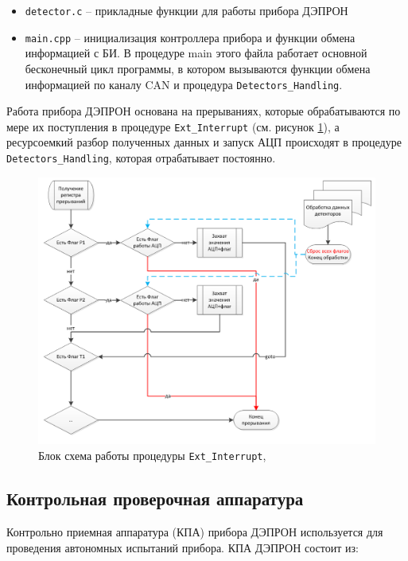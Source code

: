 \begin{itemize}
	\item 	\texttt{detector.c} -- прикладные функции для работы прибора ДЭПРОН
	
	
	\item \texttt{main.cpp} -- инициализация контроллера прибора и функции обмена информацией с БИ. В процедуре main этого файла работает основной бесконечный цикл программы, в котором вызываются функции обмена информацией по каналу CAN и процедура \texttt{Detectors\_Handling}.
	
	
\end{itemize}
Работа прибора ДЭПРОН основана на прерываниях, которые обрабатываются по мере их поступления в процедуре \texttt{Ext\_Interrupt} (см. рисунок \ref{fig:ext_interrupt}), а ресурсоемкий разбор полученных данных и запуск АЦП происходят в процедуре \texttt{Detectors\_Handling}, которая отрабатывает постоянно. 

\begin{figure}
\centering
\includegraphics[width=0.7\linewidth]{images/ext_interrupt}
\caption{Блок схема работы процедуры \texttt{Ext\_Interrupt}, }
\label{fig:ext_interrupt}
\end{figure}






\subsection{Контрольная проверочная аппаратура}

Контрольно приемная аппаратура (КПА) прибора ДЭПРОН используется для  проведения автономных испытаний прибора. КПА ДЭПРОН состоит из:


